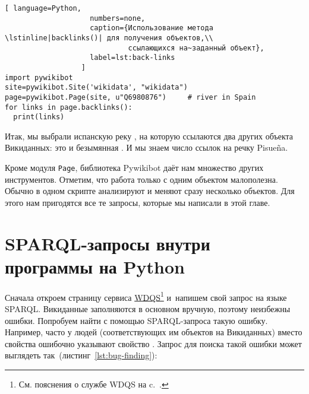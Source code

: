 \newpage
{}
\begin{lstlisting}[ language=Python,
                    numbers=none,
                    caption={Использование метода \lstinline|backlinks()| для получения объектов,\\
                             ссылающихся на~заданный объект},
                    label=lst:back-links
                  ]
import pywikibot
site=pywikibot.Site('wikidata', "wikidata")
page=pywikibot.Page(site, u"Q6980876")     # river in Spain
for links in page.backlinks():
  print(links)
\end{lstlisting}

Итак, мы выбрали испанскую реку , на которую ссылаются 
два других объекта Викиданных: это  и безымянная . 
И мы знаем число ссылок на речку Pisueña. 


Кроме модуля \lstinline|Page|, 
библиотека Pywikibot даёт нам множество других инструментов. 
Отметим, что работа только с одним объектом малополезна. 
Обычно в одном скрипте анализируют и меняют сразу несколько объектов. 
Для этого нам пригодятся все те запросы, которые мы написали в этой главе.





\section{SPARQL-запросы внутри программы на Python}
\label{sec:running-queries}

Сначала откроем страницу сервиса \href{https://query.wikidata.org/}{WDQS}\footnote[][0pt]{%
%    
    См. пояснения о службе WDQS на c.~\pageref{sect:WDQS}.%
%    
}  и~напишем свой запрос на языке SPARQL. 
Викиданные заполняются в основном вручную, поэтому неизбежны ошибки. 
Попробуем найти с помощью SPARQL-запроса такую ошибку. 
Например, часто у людей (соответствующих им объектов на Викиданных) 
вместо свойства  
ошибочно указывают свойство . 
Запрос для поиска такой ошибки может выглядеть так~(листинг~\ref{lst:bug-finding}):

